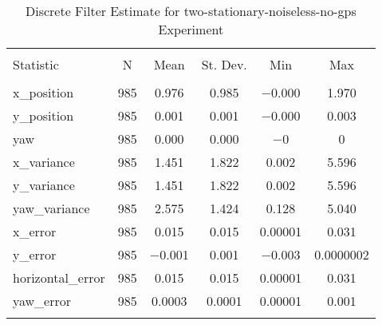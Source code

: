 
\begin{table}[h] \centering 
  \caption{Discrete Filter Estimate for two-stationary-noiseless-no-gps Experiment} 
  \label{tab:two_stationary_noiseless_no_gps_discrete_summary} 
\begin{tabular}{@{\extracolsep{5pt}}lccccc} 
\\[-1.8ex]\hline 
\hline \\[-1.8ex] 
Statistic & \multicolumn{1}{c}{N} & \multicolumn{1}{c}{Mean} & \multicolumn{1}{c}{St. Dev.} & \multicolumn{1}{c}{Min} & \multicolumn{1}{c}{Max} \\ 
\hline \\[-1.8ex] 
x\_position & 985 & 0.976 & 0.985 & $-$0.000 & 1.970 \\ 
y\_position & 985 & 0.001 & 0.001 & $-$0.000 & 0.003 \\ 
yaw & 985 & 0.000 & 0.000 & $-$0 & 0 \\ 
x\_variance & 985 & 1.451 & 1.822 & 0.002 & 5.596 \\ 
y\_variance & 985 & 1.451 & 1.822 & 0.002 & 5.596 \\ 
yaw\_variance & 985 & 2.575 & 1.424 & 0.128 & 5.040 \\ 
x\_error & 985 & 0.015 & 0.015 & 0.00001 & 0.031 \\ 
y\_error & 985 & $-$0.001 & 0.001 & $-$0.003 & 0.0000002 \\ 
horizontal\_error & 985 & 0.015 & 0.015 & 0.00001 & 0.031 \\ 
yaw\_error & 985 & 0.0003 & 0.0001 & 0.00001 & 0.001 \\ 
\hline \\[-1.8ex] 
\end{tabular} 
\end{table} 
